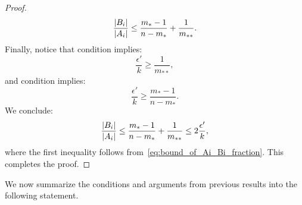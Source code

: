 \begin{remark}
\begin{proof}
\begin{equation}
                    \frac{| B_i |}{| A_i |} \leq \frac{m_* - 1}{n - m_*} + \frac{1}{m_{**}}.
                \end{equation}
                Finally, notice that condition  implies:
                \[
                    \frac{\epsilon'}{k} \geq \frac{1}{m_{**}},
                \]
                and condition  implies:
                \[
                    \frac{\epsilon'}{k} \geq \frac{m_* - 1}{n - m_*}.
                \]
                We conclude:
                \[
                    \frac{| B_i |}{| A_i |} \leq \frac{m_* - 1}{n - m_*} + \frac{1}{m_{**}} \leq 2 \frac{\epsilon'}{k},
                \]
                where the first inequality follows from~\eqref{eq:bound_of_Ai_Bi_fraction}.
                This completes the proof.
            \end{proof}
        \end{remark}

        We now summarize the conditions and arguments from previous results into the following statement.

